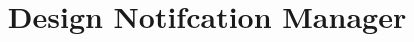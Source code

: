 \documentclass[11pt, a4paper]{article}
\begin{document}
\title{Design Notifcation Manager}
\end{document}
